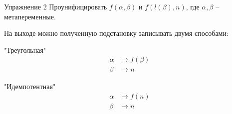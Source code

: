\begin{frame}[fragile]{Упражнение 2}
Проунифицировать $f(\alpha,\beta)$ и $f(l(\beta), n)$, где $\alpha,\beta$ -- метапеременные.
\vspace{1em}

\begin{minipage}{0.45\linewidth}
  \begin{center}
  \end{center}
\end{minipage}\hspace{1cm}
\begin{minipage}{0.45\linewidth}
  \begin{center}
  \end{center}
\end{minipage}
\vspace{1em}\pause

На выходе можно полученную подстановку записывать двумя способами:\\

\begin{minipage}[t]{0.45\linewidth}
\begin{center}
"Треугольная"
\begin{align*}
  \alpha &\mapsto f(\beta)\\
  \beta &\mapsto n
\end{align*} 
\end{center}
\end{minipage}\hspace{1cm}
\begin{minipage}[t]{0.45\linewidth}
\begin{center}
"Идемпотентная"
\begin{align*}
  \alpha &\mapsto f(n)\\
  \beta &\mapsto n
\end{align*} 
\end{center}
\end{minipage}
\end{frame}


